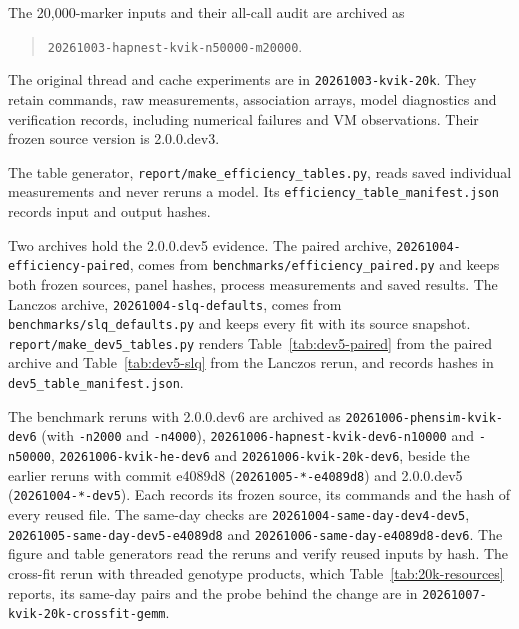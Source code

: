 \documentclass[11pt]{article}
\newcommand{\code}[1]{\texttt{#1}}
\begin{document}
The 20,000-marker inputs and their all-call audit are archived as
\begin{quote}\small
\code{20261003-hapnest-kvik-n50000-m20000}.
\end{quote}
The original thread and cache experiments are in \code{20261003-kvik-20k}.
They retain commands, raw measurements, association arrays, model
diagnostics and verification records, including numerical failures and
VM observations. Their frozen source version is 2.0.0.dev3.

The table generator, \code{report/}\allowbreak\code{make\_efficiency\_tables.py},
reads saved individual measurements and never reruns a model. Its
\code{efficiency\_table\_}\allowbreak\code{manifest.json} records input
and output hashes.

Two archives hold the 2.0.0.dev5 evidence. The paired archive,
\code{20261004-}\allowbreak\code{efficiency-paired}, comes from
\code{benchmarks/}\allowbreak\code{efficiency\_paired.py} and keeps both
frozen sources, panel hashes, process measurements and saved results. The
Lanczos archive, \code{20261004-}\allowbreak\code{slq-defaults}, comes from
\code{benchmarks/}\allowbreak\code{slq\_defaults.py} and keeps every fit
with its source snapshot.
\code{report/}\allowbreak\code{make\_dev5\_tables.py} renders
Table~\ref{tab:dev5-paired} from the paired archive and
Table~\ref{tab:dev5-slq} from the Lanczos rerun, and records hashes in
\code{dev5\_table\_}\allowbreak\code{manifest.json}.

The benchmark reruns with 2.0.0.dev6 are archived as
\code{20261006-}\allowbreak\code{phensim-kvik-}\allowbreak\code{dev6} (with
\code{-n2000} and \code{-n4000}), \code{20261006-}\allowbreak\code{hapnest-kvik-}\allowbreak\code{dev6-n10000}
and \code{-n50000}, \code{20261006-}\allowbreak\code{kvik-he-}\allowbreak\code{dev6} and
\code{20261006-}\allowbreak\code{kvik-20k-}\allowbreak\code{dev6}, beside the earlier reruns with
commit e4089d8 (\code{20261005-}\allowbreak\code{*-e4089d8}) and 2.0.0.dev5
(\code{20261004-}\allowbreak\code{*-dev5}). Each records its frozen source,
its commands and the hash of every reused file. The same-day checks are
\code{20261004-}\allowbreak\code{same-day-dev4-dev5},
\code{20261005-}\allowbreak\code{same-day-dev5-e4089d8} and
\code{20261006-}\allowbreak\code{same-day-}\allowbreak\code{e4089d8-dev6}. The figure and table
generators read the reruns and verify reused inputs by hash. The
cross-fit rerun with threaded genotype products, which
Table~\ref{tab:20k-resources} reports, its same-day pairs and the probe
behind the change are in
\code{20261007-}\allowbreak\code{kvik-20k-}\allowbreak\code{crossfit-gemm}.
\end{document}
